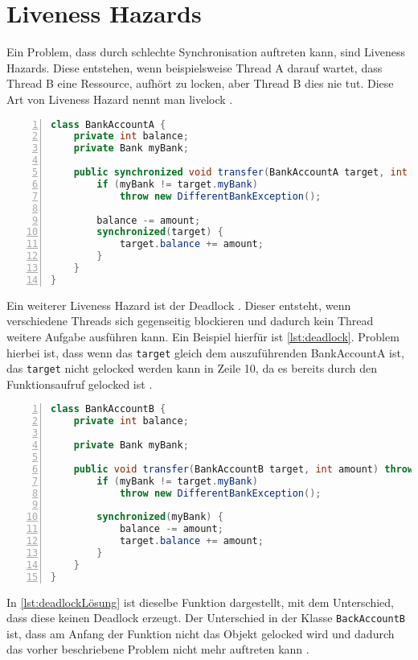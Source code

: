 \section{Liveness Hazards}

Ein Problem, dass durch schlechte Synchronisation auftreten kann, sind Liveness Hazards. Diese entstehen, wenn beispielsweise Thread A darauf wartet, dass Thread B eine Ressource, aufhört zu locken, aber Thread B dies nie tut. Diese Art von Liveness Hazard nennt man livelock \cite[vgl.][5-6]{brian}.

\begin{lstlisting}[language=Java,frame=tb,caption={Deadlock \cite{fekete_teaching_nodate}}, label={lst:deadlock}, numbers=left, stepnumber=1, captionpos=b]
class BankAccountA {
    private int balance; 
    private Bank myBank; 

    public synchronized void transfer(BankAccountA target, int amount) throws DifferentBankException {
        if (myBank != target.myBank) 
            throw new DifferentBankException(); 
        
        balance -= amount; 
        synchronized(target) { 
            target.balance += amount; 
        } 
    }
}
\end{lstlisting}

Ein weiterer Liveness Hazard ist der Deadlock \cite[vgl.][6]{brian}. Dieser entsteht, wenn verschiedene Threads sich gegenseitig blockieren und dadurch kein Thread weitere Aufgabe ausführen kann. Ein Beispiel hierfür ist \ref{lst:deadlock}. Problem hierbei ist, dass wenn das \texttt{target} gleich dem auszuführenden BankAccountA ist, das \texttt{target} nicht gelocked werden kann in Zeile 10, da es bereits durch den Funktionsaufruf gelocked ist \cite[vgl.][122]{fekete_teaching_nodate}. 
\\
\begin{lstlisting}[language=Java,frame=tb,caption={Deadlock Lösung \cite{fekete_teaching_nodate}}, label={lst:deadlockLösung}, numbers=left, stepnumber=1, captionpos=b]
class BankAccountB { 
    private int balance; 
    
    private Bank myBank; 

    public void transfer(BankAccountB target, int amount) throws DifferentBankException { 
        if (myBank != target.myBank)
            throw new DifferentBankException(); 
        
        synchronized(myBank) { 
            balance -= amount; 
            target.balance += amount; 
        } 
    }
}
\end{lstlisting}

In \ref{lst:deadlockLösung} ist dieselbe Funktion dargestellt, mit dem Unterschied, dass diese keinen Deadlock erzeugt. Der Unterschied in der Klasse \texttt{BackAccountB} ist, dass am Anfang der Funktion nicht das Objekt gelocked wird und dadurch das vorher beschriebene Problem nicht mehr auftreten kann \cite[vgl.][122]{fekete_teaching_nodate}.